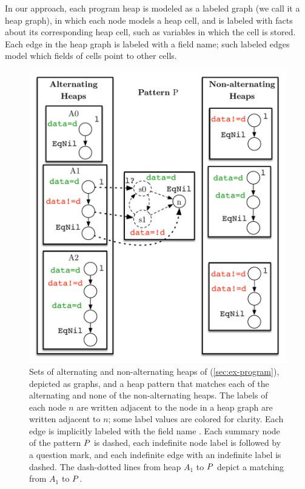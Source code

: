 In our approach, each program heap is modeled as a labeled graph (we call it a heap graph), in which each node models a heap cell, and is labeled with facts about its corresponding heap cell, such as variables in which the cell is stored.
%
Each edge in the heap graph is labeled with a field name;
%
such labeled edges model which fields of cells point to other cells.
\begin{figure}
  \centering
  \includegraphics[width=\linewidth]{fig/exs.pdf}
  \caption{Sets of alternating and non-alternating heaps of
    \altlist (\autoref{sec:ex-program}), depicted as graphs, and a
    heap pattern that matches each of the alternating and none
    of the non-alternating heaps.
    The labels of each node $n$ are written adjacent to the node in a heap
    graph are written adjacent to $n$;
    some label values are colored for clarity.
    Each edge is implicitly labeled with the field name \nextnm.
    Each summary node of the pattern $P$ is dashed, each
    indefinite node label is followed by a question mark, and each
    indefinite edge with an indefinite label is dashed.
    The dash-dotted lines from heap $A_1$ to $P$ depict a matching from $A_1$ to $P$.
  }
  \label{fig:alt-pattern}
\end{figure}

